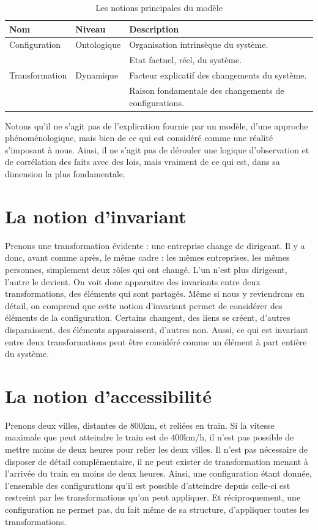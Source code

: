 \documentclass{report}
\begin{document}
	\begin{table}[H]
		\centering
		\begin{tabular}{|l|l|l|}
			\hline 
			\textbf{Nom} & \textbf{Niveau} & \textbf{Description} \\
			\hline 
			Configuration & Ontologique & Organisation intrinsèque du système. \\
			& & Etat factuel, réel, du système. \\
			\hline 
			Transformation & Dynamique & Facteur explicatif des changements du système. \\
			& & Raison fondamentale des changements de configurations. \\
			\hline 
		\end{tabular}
		\caption{Les notions principales du modèle}
	\end{table}
	
	Notons qu'il ne s'agit pas de l'explication fournie par un modèle, d'une approche phénoménologique, mais bien de ce qui est considéré comme une réalité s'imposant à nous. Ainsi, il ne s'agit pas de dérouler une logique d'observation et de corrélation des faits avec des lois, mais vraiment de ce qui est, dans sa dimension la plus fondamentale. 
	
	
	\section{La notion d'invariant}
	
	Prenons une transformation évidente : une entreprise change de dirigeant. Il y a donc, avant comme après, le même cadre : les mêmes entreprises, les mêmes personnes, simplement deux rôles qui ont changé. L'un n'est plus dirigeant, l'autre le devient. On voit donc apparaitre des invariants entre deux transformations, des éléments qui sont partagés. Même si nous y reviendrons en détail, on comprend que cette notion d'invariant permet de considérer des éléments de la configuration. Certains changent, des liens se créent, d'autres disparaissent, des éléments apparaissent, d'autres non. Aussi, ce qui est invariant entre deux transformations peut être considéré comme un élément à part entière du système. 
	
	\section{La notion d'accessibilité}
	
	Prenons deux villes, distantes de 800km, et reliées en train. Si la vitesse maximale que peut atteindre le train est de 400km/h, il n'est pas possible de mettre moins de deux heures pour relier les deux villes. Il n'est pas nécessaire de disposer de détail complémentaire, il ne peut exister de transformation menant à l'arrivée du train en moins de deux heures.  Ainsi, une configuration étant donnée, l'ensemble des configurations qu'il est possible d'atteindre depuis celle-ci est restreint par les transformations qu'on peut appliquer. Et réciproquement, une configuration ne permet pas, du fait même de sa structure, d'appliquer toutes les transformations. 
	
\end{document}
